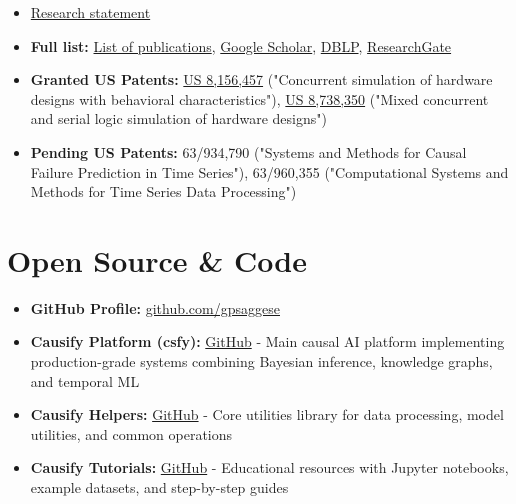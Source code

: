 \documentclass[10pt, letterpaper]{article}
\providecommand{\tightlist}{%
\setlength{\itemsep}{0pt}
\setlength{\parskip}{0pt}}
\begin{document}
  \begin{itemize}
    \tightlist

    \item \href{https://gpsaggese.github.io/06_research/}{Research
      statement}

    \item \textbf{Full list:}
      \href{https://gpsaggese.github.io/05_publications/}{List
      of publications}, \href{https://scholar.google.com/scholar?hl=en&as_sdt=0\%2C21&q=gp+saggese&btnG=}{Google
      Scholar},
      \href{https://dblp.uni-trier.de/pers/hd/s/Saggese:Giacinto_Paolo}{DBLP},
      \href{https://www.researchgate.net/scientific-contributions/70377865_GP_Saggese}{ResearchGate}

    \item \textbf{Granted US Patents:}
      \href{https://patents.google.com/patent/US8156457B2/en}{US 8,156,457}
      ("Concurrent simulation of hardware designs with behavioral
      characteristics"), \href{https://patents.google.com/patent/US8738350B2/en}{US
      8,738,350} ("Mixed concurrent and serial logic simulation of hardware
      designs")

    \item \textbf{Pending US Patents:} 63/934,790 ("Systems and Methods
      for Causal Failure Prediction in Time Series"), 63/960,355 ("Computational
      Systems and Methods for Time Series Data Processing")
  \end{itemize}

  \section{\texorpdfstring{\textbf{Open Source \& Code}}{Open Source \&
  Code}}
  \label{open-source-code}

  \begin{itemize}
    \tightlist

    \item \textbf{GitHub Profile:}
      \href{https://github.com/gpsaggese?tab=activity}{github.com/gpsaggese}

    \item \textbf{Causify Platform (csfy):}
      \href{https://github.com/causify-ai/csfy}{GitHub} - Main causal AI
      platform implementing production-grade systems combining Bayesian
      inference, knowledge graphs, and temporal ML

    \item \textbf{Causify Helpers:}
      \href{https://github.com/causify-ai/helpers}{GitHub} - Core
      utilities library for data processing, model utilities, and common
      operations

    \item \textbf{Causify Tutorials:}
      \href{https://github.com/causify-ai/tutorials}{GitHub} -
      Educational resources with Jupyter notebooks, example datasets,
      and step-by-step guides
  \end{itemize}
\end{document}
